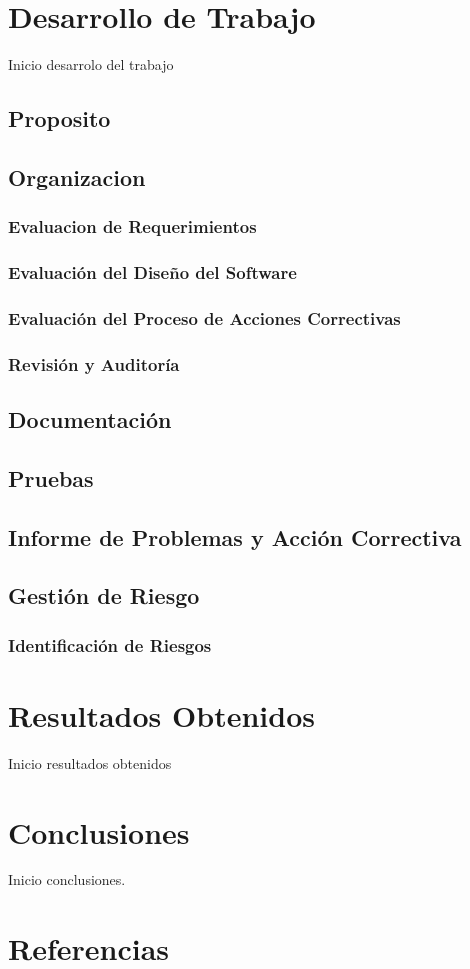 \documentclass[a4paper,10pt]{article}
\begin{document}
	\section{Desarrollo de Trabajo}
	Inicio desarrolo del trabajo
	\subsection{Proposito}
	\subsection{Organizacion}
	\subsubsection{Evaluacion de Requerimientos}
	\subsubsection{Evaluación del Diseño del Software}
	\subsubsection{Evaluación del Proceso de Acciones Correctivas}
	\subsubsection{Revisión y Auditoría}
	
	\subsection{Documentación}
	\subsection{Pruebas}
	\subsection{Informe de Problemas y Acción Correctiva}
	\subsection{Gestión de Riesgo}
	\subsubsection{Identificación de Riesgos}
	
	\section{Resultados Obtenidos}
	Inicio resultados obtenidos
	
	\section{Conclusiones}
	Inicio conclusiones.
	
	\nocite{*}
	\section{Referencias}
	\printbibliography[heading=none]
\end{document}
